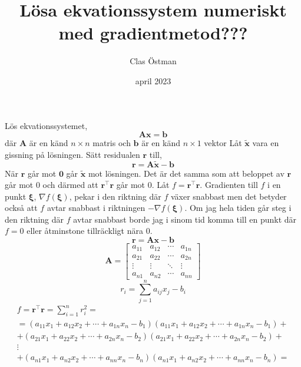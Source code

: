 \documentclass{article}
\title{Lösa ekvationssystem numeriskt med gradientmetod???}
\author{Clas Östman}
\date{april 2023}
\begin{document}
   \maketitle
   Lös ekvationssystemet,
\begin{equation}
    \mathbf{Ax}=\mathbf{b}
\end{equation}
där $\mathbf{A}$ är en känd $n\times n$ matris och $\mathbf{b}$ är en känd $n\times 1$
vektor
Låt $\mathbf{\tilde{x} }$ vara en gissning på lösningen.
Sätt residualen $\mathbf{r}$ till,
\begin{equation*}
    \mathbf{r} = \mathbf{A\tilde{x}} - \mathbf{b}
\end{equation*}
När $\mathbf{r}$ går mot $\mathbf{0}$ går  $\mathbf{\tilde{x} }$ mot lösningen.
Det är det samma som att beloppet av $\mathbf{r}$ går mot $0$ och därmed att 
$\mathbf{r}^\intercal\mathbf{r}$
går mot $0$.
Låt $f = \mathbf{r}^\intercal\mathbf{r}$. 
Gradienten till $f$ i en punkt $\boldsymbol{\xi}$, $\nabla f(\boldsymbol{\xi})$, 
pekar i den riktning där $f$ växer snabbast men det betyder också att
$f$ avtar snabbast i riktningen $- \nabla f(\boldsymbol{\xi})$. Om jag hela tiden går 
steg i den riktning där $f$ avtar snabbast borde jag i sinom tid komma till en punkt 
där $f = 0$ eller åtminstone tillräckligt nära $0$.
\begin{equation}
    \mathbf{r} =  \mathbf{Ax} - \mathbf{b}
\end{equation}
\begin{equation*}
    \mathbf{A} = \begin{bmatrix}
        a_{11} & a_{12} & \cdots & a_{1n} \\
        a_{21} & a_{22} & \cdots & a_{2n} \\
        \vdots  & \vdots  & \ddots & \vdots  \\
        a_{n1} & a_{n2} & \cdots & a_{nn} 
    \end{bmatrix}      
\end{equation*}
\begin{equation*}
    r_i =\sum_{j = 1}^{n}  a_{ij}x_j - b_i
\end{equation*}
\begin{multline*}
    f = \mathbf{r}^\intercal\mathbf{r} = \sum_{i=1}^{n}  r_i^2 = \\
    = (a_{11}x_1 + a_{12}x_2 + \cdots +a_{1n}x_n  - b_1)(a_{11}x_1 + a_{12}x_2 + \cdots
     +a_{1n}x_n  - b_1)+ \\
    + (a_{21}x_1 + a_{22}x_2 + \cdots +a_{2n}x_n  - b_2)(a_{21}x_1 + a_{22}x_2 + \cdots
     +a_{2n}x_n  - b_2)+ \\
     \vdots \\
    + (a_{n1}x_1 + a_{n2}x_2 + \cdots +a_{nn}x_n  - b_n)(a_{n1}x_1 + a_{n2}x_2 + \cdots
     +a_{nn}x_n  - b_n) =
\end{multline*}
\end{document}
